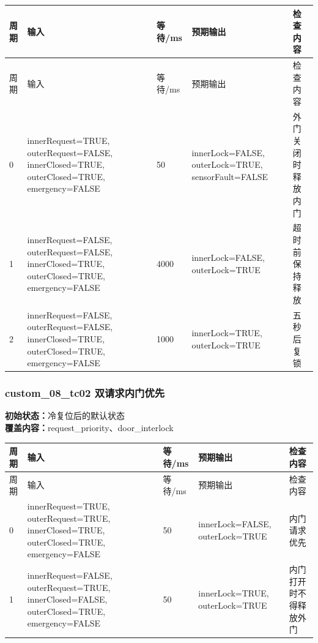 \begin{longtable}{L{1.0cm}L{4.7cm}L{1.4cm}L{4.0cm}L{2.1cm}}

\toprule

周期 & 输入 & 等待/ms & 预期输出 & 检查内容\\

\midrule

\endfirsthead

\toprule

周期 & 输入 & 等待/ms & 预期输出 & 检查内容\\

\midrule

\endhead

0 & innerRequest=TRUE, outerRequest=FALSE, innerClosed=TRUE, outerClosed=TRUE, emergency=FALSE & 50 & innerLock=FALSE, outerLock=TRUE, sensorFault=FALSE & 外门关闭时释放内门\\

1 & innerRequest=FALSE, outerRequest=FALSE, innerClosed=TRUE, outerClosed=TRUE, emergency=FALSE & 4000 & innerLock=FALSE, outerLock=TRUE & 超时前保持释放\\

2 & innerRequest=FALSE, outerRequest=FALSE, innerClosed=TRUE, outerClosed=TRUE, emergency=FALSE & 1000 & innerLock=TRUE, outerLock=TRUE & 五秒后复锁\\

\bottomrule

\end{longtable}

\subsubsection{{\ttfamily custom\_08\_tc02} 双请求内门优先}

\noindent\textbf{初始状态：}冷复位后的默认状态\\

\textbf{覆盖内容：}request\_priority、door\_interlock

\begin{longtable}{L{1.0cm}L{4.7cm}L{1.4cm}L{4.0cm}L{2.1cm}}

\toprule

周期 & 输入 & 等待/ms & 预期输出 & 检查内容\\

\midrule

\endfirsthead

\toprule

周期 & 输入 & 等待/ms & 预期输出 & 检查内容\\

\midrule

\endhead

0 & innerRequest=TRUE, outerRequest=TRUE, innerClosed=TRUE, outerClosed=TRUE, emergency=FALSE & 50 & innerLock=FALSE, outerLock=TRUE & 内门请求优先\\

1 & innerRequest=FALSE, outerRequest=TRUE, innerClosed=FALSE, outerClosed=TRUE, emergency=FALSE & 50 & innerLock=TRUE, outerLock=TRUE & 内门打开时不得释放外门\\

\bottomrule

\end{longtable}

